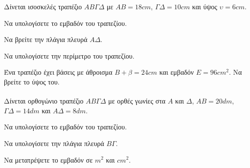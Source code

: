 \documentclass[11pt,a4paper,modern]{FFExercises}
\begin{document}
\askhsh Δίνεται ισοσκελές τραπέζιο $AB\varGamma\varDelta$ με $AB=18\si{cm}$, $\varGamma\varDelta=10\si{cm}$ και ύψος $\upsilon=6\si{cm}$.
\begin{center}
\end{center}
\begin{alist}
\item Να υπολογίσετε το εμβαδόν του τραπεζίου.
\item Να βρείτε την πλάγια πλευρά $A\varDelta$.
\item Να υπολογίσετε την περίμετρο του τραπεζίου.
\end{alist}

\askhsh Ένα τραπέζιο έχει βάσεις με άθροισμα $B+\beta=24\si{cm}$ και εμβαδόν $E=96\si{cm^2}$. Να βρείτε το ύψος του.\\\\

\askhsh Δίνεται ορθογώνιο τραπέζιο $AB\varGamma\varDelta$ με ορθές γωνίες στα $A$ και $\varDelta$, $AB=20\si{dm}$, $\varGamma\varDelta=14\si{dm}$ και $A\varDelta=8\si{dm}$.
\begin{center}
\end{center}
\begin{alist}
\item Να υπολογίσετε το εμβαδόν του τραπεζίου.
\item Να υπολογίσετε την πλάγια πλευρά $B\varGamma$.
\item Να μετατρέψετε το εμβαδόν σε $\si{m^2}$ και $\si{cm^2}$.
\end{alist}
\end{document}
